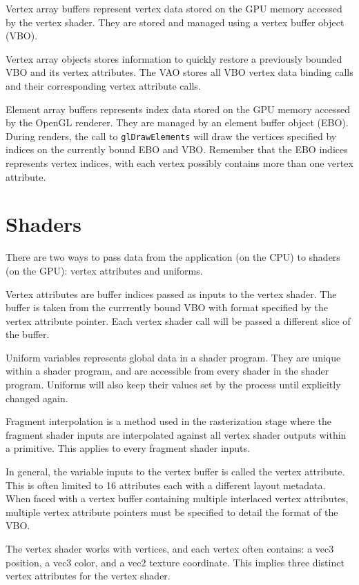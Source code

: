 \documentclass[11pt]{article}
\numberwithin{equation}{section}
\begin{document}
Vertex array buffers represent vertex data stored on the GPU memory accessed by the vertex shader. They are stored and managed using a vertex buffer object (VBO).

Vertex array objects stores information to quickly restore a previously bounded VBO and its vertex attributes. The VAO stores all VBO vertex data binding calls and their corresponding vertex attribute calls.

Element array buffers represents index data stored on the GPU memory accessed by the OpenGL renderer. They are managed by an element buffer object (EBO). During renders, the call to \verb|glDrawElements| will draw the vertices specified by indices on the currently bound EBO and VBO. Remember that the EBO indices represents vertex indices, with each vertex possibly contains more than one vertex attribute.

\section{Shaders}
There are two ways to pass data from the application (on the CPU) to shaders (on the GPU): vertex attributes and uniforms.

Vertex attributes are buffer indices passed as inputs to the vertex shader. The buffer is taken from the currrently bound VBO with format specified by the vertex attribute pointer. Each vertex shader call will be passed a different slice of the buffer.

Uniform variables represents global data in a shader program. They are unique within a shader program, and are accessible from every shader in the shader program. Uniforms will also keep their values set by the process until explicitly changed again.

Fragment interpolation is a method used in the rasterization stage where the fragment shader inputs are interpolated against all vertex shader outputs within a primitive. This applies to every fragment shader inputs.

In general, the variable inputs to the vertex buffer is called the vertex attribute. This is often limited to 16 attributes each with a different layout metadata. When faced with a vertex buffer containing multiple interlaced vertex attributes, multiple vertex attribute pointers must be specified to detail the format of the VBO.

The vertex shader works with vertices, and each vertex often contains: a vec3 position, a vec3 color, and a vec2 texture coordinate. This implies three distinct vertex attributes for the vertex shader.
\end{document}
